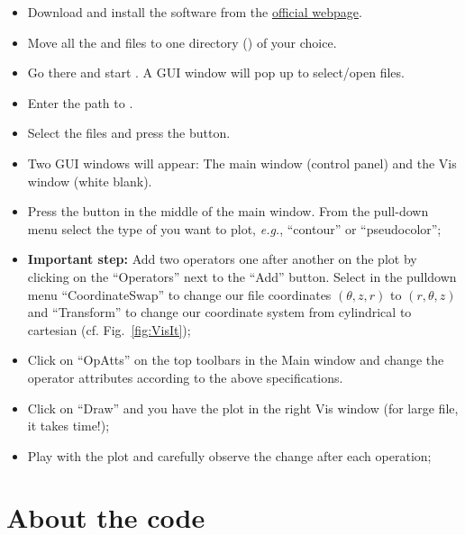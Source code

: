 \documentclass[a4paper, 11pt, DIV=11]{scrartcl}
\begin{document}
\begin{itemize}
\item Download and install the software from the \href{https://wci.llnl.gov/simulation/computer-codes/visit}{official webpage}.
\item Move all the  and  files to one directory () of your choice.
\item Go there and start \visit. A GUI window will pop up to select/open files.
\item Enter the path to .
\item Select the  files and press the  button.
\item Two GUI windows will appear: The \visit main window (control panel) and the Vis window (white blank).
\item Press the  button in the middle of the main window. From the
pull-down menu select the type of you want to plot, \textit{e.g.}, ``contour'' or ``pseudocolor'';
  \item  \textbf{Important step:} Add two operators one after another on the plot by clicking on the ``Operators'' next to the ``Add'' button. 
 Select in the pulldown menu ``CoordinateSwap'' to change our file coordinates $(\theta,z,r)$ to $(r,\theta,z)$ 
 and ``Transform'' to change our coordinate system from
 cylindrical to cartesian (cf. Fig.~\ref{fig:VisIt}); 
  \item  Click on ``OpAtts'' on the top toolbars in the Main window and change the operator attributes according to the above specifications.
  \item  Click on ``Draw'' and you have the plot in the right Vis window (for large file, it takes time!);
  \item  Play with the plot and carefully observe the change after each operation;
\end{itemize} 





















\section{About the code}
\label{sec:aboutTheCode}
\end{document}
